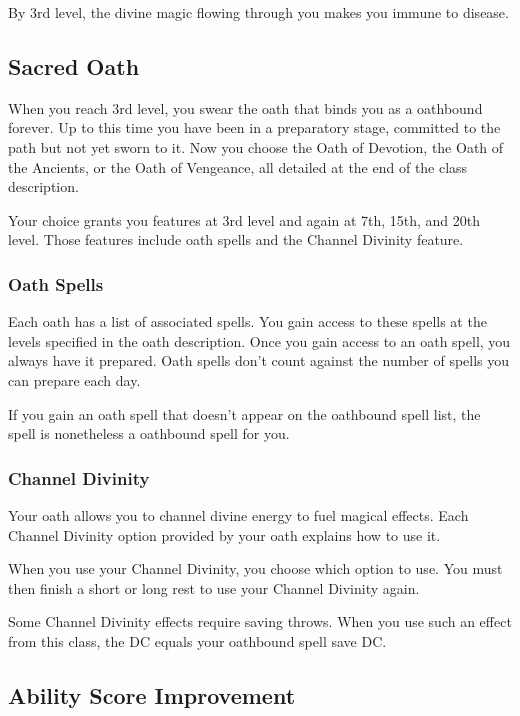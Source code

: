 By 3rd level, the divine magic flowing through you makes you immune to disease.

\subsection{Sacred Oath}

When you reach 3rd level, you swear the oath that binds you as a oathbound forever. Up to this time you have been in a preparatory stage, committed to the path but not yet sworn to it. Now you choose the Oath of Devotion, the Oath of the Ancients, or the Oath of Vengeance, all detailed at the end of the class description.

Your choice grants you features at 3rd level and again at 7th, 15th, and 20th level. Those features include oath spells and the Channel Divinity feature.

\subsubsection{Oath Spells}

Each oath has a list of associated spells. You gain access to these spells at the levels specified in the oath description. Once you gain access to an oath spell, you always have it prepared. Oath spells don't count against the number of spells you can prepare each day.

If you gain an oath spell that doesn't appear on the oathbound spell list, the spell is nonetheless a oathbound spell for you.

\subsubsection{Channel Divinity}

Your oath allows you to channel divine energy to fuel magical effects. Each Channel Divinity option provided by your oath explains how to use it.

When you use your Channel Divinity, you choose which option to use. You must then finish a short or long rest to use your Channel Divinity again.

Some Channel Divinity effects require saving throws. When you use such an effect from this class, the DC equals your oathbound spell save DC.

\subsection{Ability Score Improvement}

